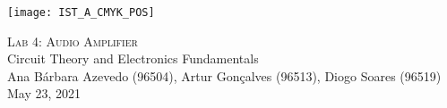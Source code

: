 \thispagestyle {empty}

\texttt{[image: IST\_A\_CMYK\_POS]}

\begin{center}
%
\vspace{1.0cm}

\vspace{3cm}
\textsc{\Huge Lab 4: Audio Amplifier}\\
\vspace{0.5cm}
{\Large Circuit Theory and Electronics Fundamentals} \\
\vspace{0.8cm}
{\normalsize Ana Bárbara Azevedo (96504), Artur Gonçalves (96513), Diogo Soares (96519)} \\

\vspace{0.5cm}
{May 23, 2021}\\
\end{center}
\vspace{2.5cm}

